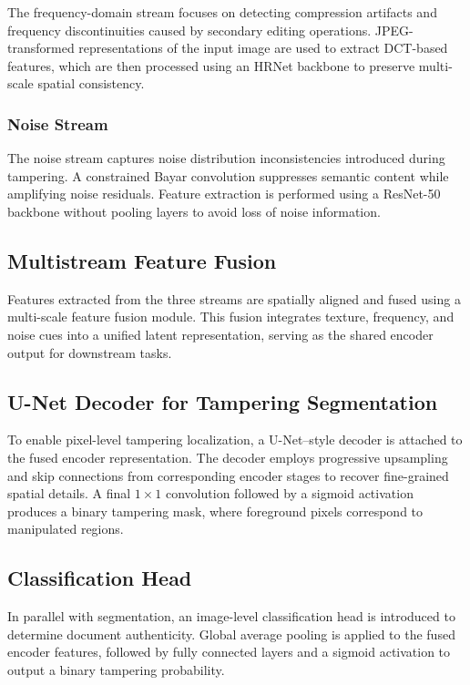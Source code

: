 \documentclass[12pt]{article}
\begin{document}
The frequency-domain stream focuses on detecting compression artifacts and frequency discontinuities caused by secondary editing operations. JPEG-transformed representations of the input image are used to extract DCT-based features, which are then processed using an HRNet backbone to preserve multi-scale spatial consistency.

\subsubsection{Noise Stream}

The noise stream captures noise distribution inconsistencies introduced during tampering. A constrained Bayar convolution suppresses semantic content while amplifying noise residuals. Feature extraction is performed using a ResNet-50 backbone without pooling layers to avoid loss of noise information.

\subsection{Multistream Feature Fusion}

Features extracted from the three streams are spatially aligned and fused using a multi-scale feature fusion module. This fusion integrates texture, frequency, and noise cues into a unified latent representation, serving as the shared encoder output for downstream tasks.

\subsection{U-Net Decoder for Tampering Segmentation}

To enable pixel-level tampering localization, a U-Net–style decoder is attached to the fused encoder representation. The decoder employs progressive upsampling and skip connections from corresponding encoder stages to recover fine-grained spatial details. A final $1\times1$ convolution followed by a sigmoid activation produces a binary tampering mask, where foreground pixels correspond to manipulated regions.

\subsection{Classification Head}

In parallel with segmentation, an image-level classification head is introduced to determine document authenticity. Global average pooling is applied to the fused encoder features, followed by fully connected layers and a sigmoid activation to output a binary tampering probability.
\end{document}
